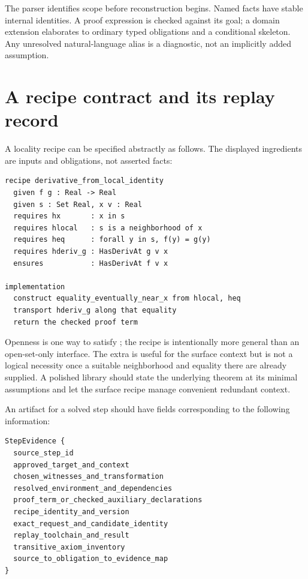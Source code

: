 \documentclass[11pt,letterpaper]{article}
\newcommand{\code}[1]{\texttt{\detokenize{#1}}}
\theoremstyle{remark}
\begin{document}
The parser identifies scope before reconstruction begins. Named facts have stable internal identities. A proof expression is checked against its goal; a domain extension elaborates to ordinary typed obligations and a conditional skeleton. Any unresolved natural-language alias is a diagnostic, not an implicitly added assumption.

\clearpage
\section{A recipe contract and its replay record}
\label{app:recipe}

A locality recipe can be specified abstractly as follows. The displayed ingredients are inputs and obligations, not asserted facts:
\par\noindent\begin{minipage}{\linewidth}
\begin{lstlisting}[caption={Proposed recipe specification for transferring a derivative.}]
recipe derivative_from_local_identity
  given f g : Real -> Real
  given s : Set Real, x v : Real
  requires hx       : x in s
  requires hlocal   : s is a neighborhood of x
  requires heq      : forall y in s, f(y) = g(y)
  requires hderiv_g : HasDerivAt g v x
  ensures           : HasDerivAt f v x

implementation
  construct equality_eventually_near_x from hlocal, heq
  transport hderiv_g along that equality
  return the checked proof term
\end{lstlisting}
\end{minipage}\par
Openness is one way to satisfy \code{hlocal}; the recipe is intentionally more general than an open-set-only interface. The extra \code{hx} is useful for the surface context but is not a logical necessity once a suitable neighborhood and equality there are already supplied. A polished library should state the underlying theorem at its minimal assumptions and let the surface recipe manage convenient redundant context.

An artifact for a solved step should have fields corresponding to the following information:
\par\noindent\begin{minipage}{\linewidth}
\begin{lstlisting}[caption={Conceptual evidence record; metadata is not itself a proof.}]
StepEvidence {
  source_step_id
  approved_target_and_context
  chosen_witnesses_and_transformation
  resolved_environment_and_dependencies
  proof_term_or_checked_auxiliary_declarations
  recipe_identity_and_version
  exact_request_and_candidate_identity
  replay_toolchain_and_result
  transitive_axiom_inventory
  source_to_obligation_to_evidence_map
}
\end{lstlisting}
\end{minipage}\par
\end{document}
